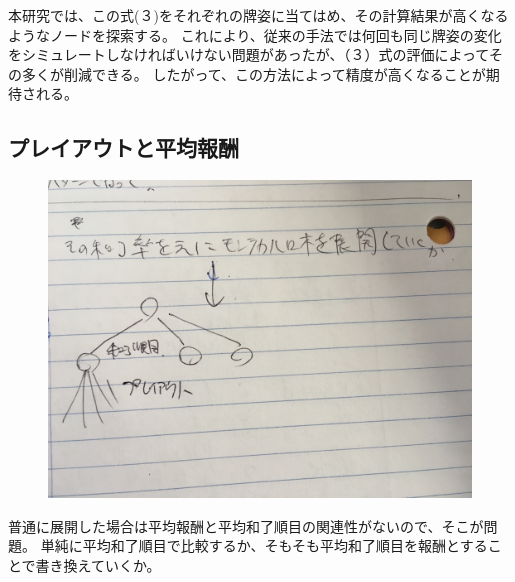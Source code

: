 本研究では、この式(３)をそれぞれの牌姿に当てはめ、その計算結果が高くなるようなノードを探索する。
これにより、従来の手法では何回も同じ牌姿の変化をシミュレートしなければいけない問題があったが、（３）式の評価によってその多くが削減できる。
したがって、この方法によって精度が高くなることが期待される。

\subsection{プレイアウトと平均報酬}

\begin{figure}
 \centering
 \includegraphics[keepaspectratio, scale=0.1,bb=0 0 4032 3024]
      {img/playout.jpg}
 \caption{}
 \label{math}
\end{figure}

普通に展開した場合は平均報酬と平均和了順目の関連性がないので、そこが問題。
単純に平均和了順目で比較するか、そもそも平均和了順目を報酬とすることで書き換えていくか。




